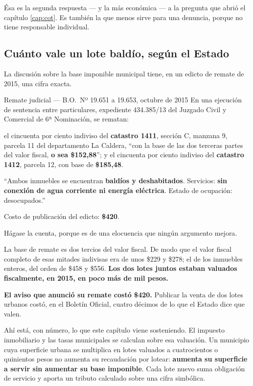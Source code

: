 Ésa es la segunda respuesta --- y la más económica --- a la pregunta que abrió el capítulo \ref{cap:cot}. Es también la que menos sirve para una denuncia, porque no tiene responsable individual.

\subsection*{Cuánto vale un lote baldío, según el Estado}

La discusión sobre la base imponible municipal tiene, en un edicto de remate de 2015, una cifra exacta.

\begin{ficha}{Remate judicial --- B.O.\ Nº 19.651 a 19.653, octubre de 2015}
En una ejecución de sentencia entre particulares, expediente 434.385/13 del Juzgado Civil y Comercial de 6ª Nominación, se rematan:

el cincuenta por ciento indiviso del \textbf{catastro 1411}, sección C, manzana 9, parcela 11 del departamento La Caldera, ``con la base de las dos terceras partes del valor fiscal, \textbf{o sea \$152,88}''; y el cincuenta por ciento indiviso del \textbf{catastro 1412}, parcela 12, con base de \textbf{\$185,48}.

``Ambos inmuebles se encuentran \textbf{baldíos y deshabitados}. Servicios: \textbf{sin conexión de agua corriente ni energía eléctrica}. Estado de ocupación: desocupados.''

Costo de publicación del edicto: \textbf{\$420}.
\end{ficha}

Hágase la cuenta, porque es de una elocuencia que ningún argumento mejora.

La base de remate es dos tercios del valor fiscal. De modo que el valor fiscal completo de esas mitades indivisas era de unos \$229 y \$278; el de los inmuebles enteros, del orden de \$458 y \$556. \textbf{Los dos lotes juntos estaban valuados fiscalmente, en 2015, en poco más de mil pesos.}

\textbf{El aviso que anunció su remate costó \$420.} Publicar la venta de dos lotes urbanos costó, en el Boletín Oficial, cuatro décimos de lo que el Estado dice que valen.

Ahí está, con número, lo que este capítulo viene sosteniendo. El impuesto inmobiliario y las tasas municipales se calculan sobre esa valuación. Un municipio cuya superficie urbana se multiplica en lotes valuados a cuatrocientos o quinientos pesos no aumenta su recaudación por lotear: \textbf{aumenta su superficie a servir sin aumentar su base imponible}. Cada lote nuevo suma obligación de servicio y aporta un tributo calculado sobre una cifra simbólica.

